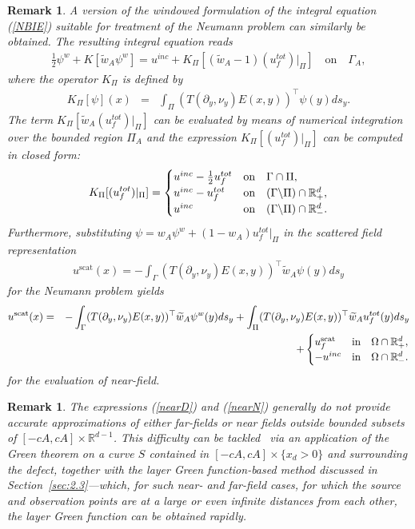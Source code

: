 \documentclass[10pt]{article}
\numberwithin{equation}{section}
\newcommand{\R}{{\mathbb R}}
\newcommand{\be}{\begin{eqnarray}}
\newcommand{\ben}{\begin{eqnarray*}}
\newcommand{\en}{\end{eqnarray}}
\newcommand{\enn}{\end{eqnarray*}}
\newcommand{\pa}{\partial}
\newtheorem{remark}[theorem]{Remark}
\begin{document}
\begin{remark}
  A version of the windowed formulation of the integral equation
  (\ref{NBIE}) suitable for treatment of the Neumann problem can similarly be obtained. The resulting integral equation reads
\be
\label{WNBIE}
\frac{1}{2}\psi^w+K[\widetilde{w}_A\psi^w]=u^{inc}+K_\Pi[(\widetilde{w}_A-1)(u_f^{tot})|_\Pi] \quad\mbox{on}\quad \Gamma_A,
\en
where the operator $K_\Pi$ is defined by
\ben
K_\Pi[\psi](x)&=&\int_\Pi (T(\pa_y,\nu_y)E(x,y))^\top\psi(y)ds_y.
\enn
The term $K_\Pi[\widetilde{w}_A(u_f^{tot})|_\Pi]$ can be evaluated by means of numerical integration over the bounded region $\Pi_A$ and the expression $K_\Pi[(u_f^{tot})|_\Pi]$ can be computed in closed form:
\ben
K_\Pi[(u_f^{tot})|_\Pi]=\begin{cases}
u^{inc}- \frac{1}{2}u_f^{tot} & \mbox{on}\quad\Gamma\cap\Pi, \cr
u^{inc}- u_f^{tot} & \mbox{on}\quad (\Gamma\backslash\Pi)\cap\R^d_+, \cr
u^{inc} & \mbox{on}\quad (\Gamma\backslash\Pi)\cap\R^d_-.
\end{cases}
\enn Furthermore, substituting
$\psi = w_A\psi^w+(1-w_A)u_f^{tot}|_\Pi$ in the scattered field
representation \ben u^\mathrm{scat}(x)=-\int_\Gamma
(T(\pa_y,\nu_y)E(x,y))^\top\widetilde{w}_A\psi(y)ds_y \enn for the
Neumann problem yields \be
\label{nearN}
u^\mathrm{scat}(x)&=&-\int_\Gamma (T(\pa_y,\nu_y)E(x,y))^\top\widetilde{w}_A\psi^w(y)ds_y+ \int_\Pi (T(\pa_y,\nu_y)E(x,y))^\top \widetilde{w}_Au_f^{tot}(y)ds_y\nonumber\\
&\quad& +\begin{cases}
u_f^\mathrm{scat} & \mbox{in}\quad \Omega\cap\R^d_+,\cr
-u^{inc} & \mbox{in}\quad \Omega\cap\R^d_-.
\end{cases}
\en
for the evaluation of near-field.
\end{remark}

\begin{remark}
  The expressions (\ref{nearD}) and (\ref{nearN}) generally do not
  provide accurate approximations of either far-fields or near fields
  outside bounded subsets of $[-cA,cA]\times \R^{d-1}$. This
  difficulty can be tackled~\cite{BLPT16} via an application of the
  Green theorem on a curve $S$ contained in $[-cA,cA]\times \{x_d>0\}$
  and surrounding the defect, together with the layer Green
  function-based method discussed in Section~\ref{sec:2.3}---which,
  for such near- and far-field cases, for which the source and
  observation points are at a large or even infinite distances from
  each other, the layer Green function can be obtained rapidly.  
\end{remark}
\end{document}
